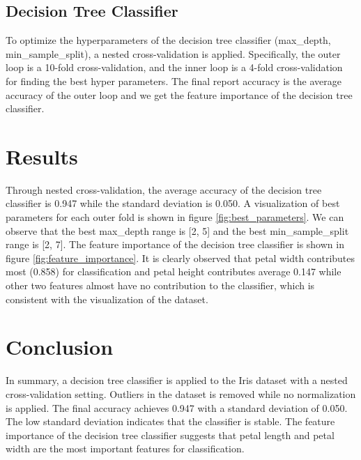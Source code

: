 \documentclass[12pt,a4paper]{article}
\begin{document}
\subsection{Decision Tree Classifier}\label{subsec:classifier}
To optimize the hyperparameters of the decision tree classifier (max\_depth, min\_sample\_split), a nested cross-validation\cite{scikit-learn_cross_validation} is applied. 
Specifically, the outer loop is a 10-fold cross-validation, and the inner loop is a 4-fold cross-validation for finding the best hyper parameters. 
The final report accuracy is the average accuracy of the outer loop and we get the feature importance of the decision tree classifier.


\section{Results}\label{sec:results}
Through nested cross-validation, the average accuracy of the decision tree classifier is 0.947 while the standard deviation is 0.050. 
A visualization of best parameters for each outer fold is shown in figure \ref{fig:best_parameters}. We can observe that the best max\_depth range is [2, 5] and the best min\_sample\_split range is [2, 7]. 
The feature importance of the decision tree classifier is shown in figure \ref{fig:feature_importance}. 
It is clearly observed that petal width contributes most (0.858) for classification and petal height contributes average 0.147 while other two features almost have no contribution to the classifier, which is consistent with the visualization of the dataset.

\section{Conclusion}\label{sec:conclusion}
In summary, a decision tree classifier is applied to the Iris dataset with a nested cross-validation setting. Outliers in the dataset is removed while no normalization is applied. The final accuracy achieves 0.947 with a standard deviation of 0.050. 
The low standard deviation indicates that the classifier is stable. The feature importance of the decision tree classifier suggests that petal length and petal width are the most important features for classification.

\printbibliography
\end{document}

